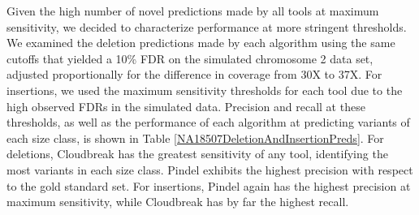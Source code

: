 \documentclass[11pt]{article}
\begin{document}
Given the high number of novel predictions made by all tools at maximum sensitivity, we decided to characterize performance at more stringent thresholds. We examined the deletion predictions made by each algorithm using the same cutoffs that yielded a 10\% FDR on the simulated chromosome 2 data set, adjusted proportionally for the difference in coverage from 30X to 37X. For insertions, we used the maximum sensitivity thresholds for each tool due to the high observed FDRs in the simulated data. Precision and recall at these thresholds, as well as the performance of each algorithm at predicting variants of each size class, is shown in Table \ref{NA18507DeletionAndInsertionPreds}. For deletions, Cloudbreak has the greatest sensitivity of any tool, identifying the most variants in each size class. Pindel exhibits the highest precision with respect to the gold standard set. For insertions, Pindel again has the highest precision at maximum sensitivity, while Cloudbreak has by far the highest recall.
\end{document}
